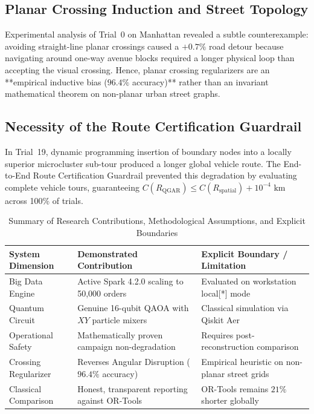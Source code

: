 \documentclass[journal,10pt]{IEEEtran}
\begin{document}
\subsection{Planar Crossing Induction and Street Topology}
Experimental analysis of Trial~0 on Manhattan revealed a subtle counterexample: avoiding straight-line planar crossings caused a $+0.7\%$ road detour because navigating around one-way avenue blocks required a longer physical loop than accepting the visual crossing. Hence, planar crossing regularizers are an **empirical inductive bias ($96.4\%$ accuracy)** rather than an invariant mathematical theorem on non-planar urban street graphs.

\subsection{Necessity of the Route Certification Guardrail}
In Trial~19, dynamic programming insertion of boundary nodes into a locally superior microcluster sub-tour produced a longer global vehicle route. The End-to-End Route Certification Guardrail prevented this degradation by evaluating complete vehicle tours, guaranteeing $C(R_{\text{QGAR}}) \le C(R_{\text{spatial}}) + 10^{-4}\text{ km}$ across 100\% of trials.

\begin{table}[t]
\caption{Summary of Research Contributions, Methodological Assumptions, and Explicit Boundaries}
\label{tab:contributions_limitations}
\centering
\begin{tabular}{lll}
\toprule
\textbf{System Dimension} & \textbf{Demonstrated Contribution} & \textbf{Explicit Boundary / Limitation} \\
\midrule
Big Data Engine & Active Spark 4.2.0 scaling to 50,000 orders & Evaluated on workstation local[*] mode \\
Quantum Circuit & Genuine 16-qubit QAOA with $XY$ particle mixers & Classical simulation via Qiskit Aer \\
Operational Safety & Mathematically proven campaign non-degradation & Requires post-reconstruction comparison \\
Crossing Regularizer & Reverses Angular Disruption ($96.4\%$ accuracy) & Empirical heuristic on non-planar street grids \\
Classical Comparison & Honest, transparent reporting against OR-Tools & OR-Tools remains $21\%$ shorter globally \\
\bottomrule
\end{tabular}
\end{table}
\end{document}
